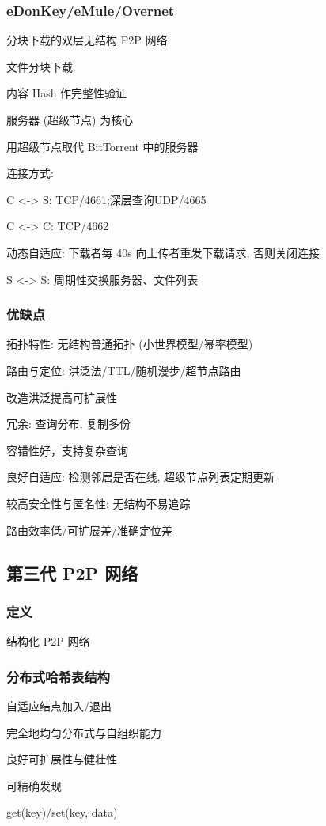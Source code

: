 \documentclass[UTF8,cs4size]{ctexart}
\begin{document}
\subsubsection{eDonKey/eMule/Overnet}
分块下载的双层无结构 P2P 网络:
\begin{compactitem}
  \item 文件分块下载
  \item 内容 Hash 作完整性验证
  \item 服务器 (超级节点) 为核心
  \item 用超级节点取代 BitTorrent 中的服务器
\end{compactitem}

连接方式:
\begin{compactitem}
  \item C <-> S: TCP/4661;深层查询UDP/4665
  \item C <-> C: TCP/4662
  \item 动态自适应: 下载者每 40s 向上传者重发下载请求, 否则关闭连接
  \item S <-> S: 周期性交换服务器、文件列表
\end{compactitem}
\subsubsection{优缺点}
\begin{compactitem}
  \item 拓扑特性: 无结构普通拓扑 (小世界模型/幂率模型)
  \item 路由与定位: 洪泛法/TTL/随机漫步/超节点路由
  \item 改造洪泛提高可扩展性
  \item 冗余: 查询分布, 复制多份
  \item 容错性好，支持复杂查询
  \item 良好自适应: 检测邻居是否在线, 超级节点列表定期更新
  \item 较高安全性与匿名性: 无结构不易追踪
  \item 路由效率低/可扩展差/准确定位差
\end{compactitem}
\subsection{第三代 P2P 网络}
\subsubsection{定义}
结构化 P2P 网络
\subsubsection{分布式哈希表结构}
\begin{compactitem}
  \item 自适应结点加入/退出
  \item 完全地均匀分布式与自组织能力
  \item 良好可扩展性与健壮性
  \item 可精确发现
  \item get(key)/set(key, data)
\end{compactitem}
\end{document}
